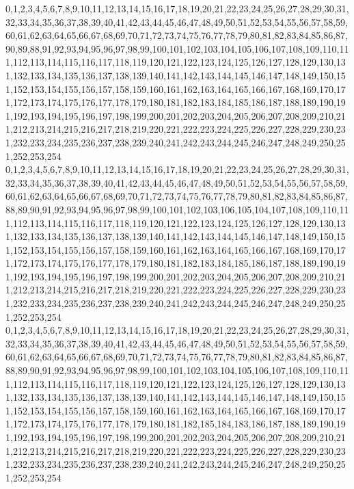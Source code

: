\documentclass[12pt]{article}
\begin{document}
{0,1,2,3,4,5,6,7,8,9,10,11,12,13,14,15,16,17,18,19,20,21,22,23,24,25,26,27,28,29,30,31,32,33,34,35,36,37,38,39,40,41,42,43,44,45,46,47,48,49,50,51,52,53,54,55,56,57,58,59,60,61,62,63,64,65,66,67,68,69,70,71,72,73,74,75,76,77,78,79,80,81,82,83,84,85,86,87,90,89,88,91,92,93,94,95,96,97,98,99,100,101,102,103,104,105,106,107,108,109,110,111,112,113,114,115,116,117,118,119,120,121,122,123,124,125,126,127,128,129,130,131,132,133,134,135,136,137,138,139,140,141,142,143,144,145,146,147,148,149,150,151,152,153,154,155,156,157,158,159,160,161,162,163,164,165,166,167,168,169,170,171,172,173,174,175,176,177,178,179,180,181,182,183,184,185,186,187,188,189,190,191,192,193,194,195,196,197,198,199,200,201,202,203,204,205,206,207,208,209,210,211,212,213,214,215,216,217,218,219,220,221,222,223,224,225,226,227,228,229,230,231,232,233,234,235,236,237,238,239,240,241,242,243,244,245,246,247,248,249,250,251,252,253,254\\
0,1,2,3,4,5,6,7,8,9,10,11,12,13,14,15,16,17,18,19,20,21,22,23,24,25,26,27,28,29,30,31,32,33,34,35,36,37,38,39,40,41,42,43,44,45,46,47,48,49,50,51,52,53,54,55,56,57,58,59,60,61,62,63,64,65,66,67,68,69,70,71,72,73,74,75,76,77,78,79,80,81,82,83,84,85,86,87,88,89,90,91,92,93,94,95,96,97,98,99,100,101,102,103,106,105,104,107,108,109,110,111,112,113,114,115,116,117,118,119,120,121,122,123,124,125,126,127,128,129,130,131,132,133,134,135,136,137,138,139,140,141,142,143,144,145,146,147,148,149,150,151,152,153,154,155,156,157,158,159,160,161,162,163,164,165,166,167,168,169,170,171,172,173,174,175,176,177,178,179,180,181,182,183,184,185,186,187,188,189,190,191,192,193,194,195,196,197,198,199,200,201,202,203,204,205,206,207,208,209,210,211,212,213,214,215,216,217,218,219,220,221,222,223,224,225,226,227,228,229,230,231,232,233,234,235,236,237,238,239,240,241,242,243,244,245,246,247,248,249,250,251,252,253,254\\
0,1,2,3,4,5,6,7,8,9,10,11,12,13,14,15,16,17,18,19,20,21,22,23,24,25,26,27,28,29,30,31,32,33,34,35,36,37,38,39,40,41,42,43,44,45,46,47,48,49,50,51,52,53,54,55,56,57,58,59,60,61,62,63,64,65,66,67,68,69,70,71,72,73,74,75,76,77,78,79,80,81,82,83,84,85,86,87,88,89,90,91,92,93,94,95,96,97,98,99,100,101,102,103,104,105,106,107,108,109,110,111,112,113,114,115,116,117,118,119,120,121,122,123,124,125,126,127,128,129,130,131,132,133,134,135,136,137,138,139,140,141,142,143,144,145,146,147,148,149,150,151,152,153,154,155,156,157,158,159,160,161,162,163,164,165,166,167,168,169,170,171,172,173,174,175,176,177,178,179,180,181,182,185,184,183,186,187,188,189,190,191,192,193,194,195,196,197,198,199,200,201,202,203,204,205,206,207,208,209,210,211,212,213,214,215,216,217,218,219,220,221,222,223,224,225,226,227,228,229,230,231,232,233,234,235,236,237,238,239,240,241,242,243,244,245,246,247,248,249,250,251,252,253,254\\
}
\end{document}
